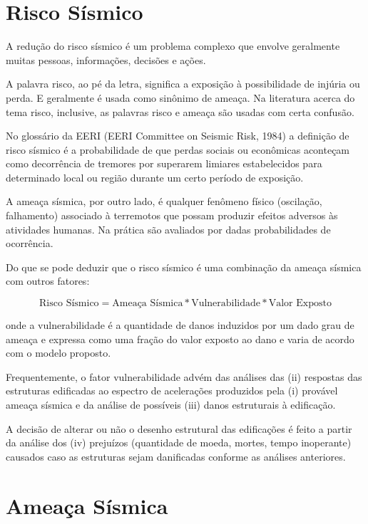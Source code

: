 \section{Risco Sísmico}
\label{sec:risco_sismico}

A redução do risco sísmico é um problema complexo que envolve geralmente muitas pessoas, informações, decisões e ações.

A palavra risco, ao pé da letra, significa a exposição à possibilidade de injúria ou perda. E geralmente é usada como
sinônimo de ameaça. Na literatura acerca do tema risco, inclusive, as palavras risco e ameaça são usadas com certa
confusão.

No glossário da EERI (EERI Committee on Seismic Risk, 1984) a definição de risco sísmico é a probabilidade de que
perdas sociais ou econômicas aconteçam como decorrência de tremores por superarem limiares estabelecidos para
determinado local ou região durante um certo período de exposição.

A ameaça sísmica, por outro lado, é qualquer fenômeno físico (oscilação, falhamento) associado à terremotos que possam
produzir efeitos adversos às atividades humanas. Na prática são avaliados por dadas probabilidades de ocorrência.

Do que se pode deduzir que o risco sísmico é uma combinação da ameaça sísmica com outros fatores:

\begin{equation}
		\text{Risco Sísmico} = \text{Ameaça Sísmica} \ast \text{Vulnerabilidade} \ast \text{Valor Exposto}
	\label{eq:risk}
\end{equation}

onde a vulnerabilidade é a quantidade de danos induzidos por um dado grau de ameaça e expressa como uma fração do
valor exposto ao dano e varia de acordo com o modelo proposto.

Frequentemente, o fator vulnerabilidade advém das análises das (ii) respostas das estruturas edificadas ao espectro de
acelerações produzidos pela (i) provável ameaça sísmica e da análise de possíveis (iii) danos estruturais à edificação.

A decisão de alterar ou não o desenho estrutural das edificações é feito a partir da análise dos (iv) prejuízos
(quantidade de moeda, mortes, tempo inoperante) causados caso as estruturas sejam danificadas conforme as análises anteriores.


\section{Ameaça Sísmica}
\label{sec:ameaca_sismica}

